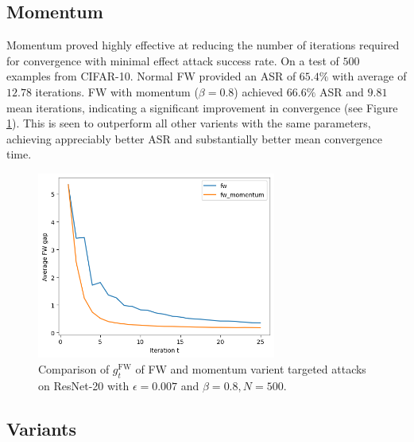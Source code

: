 \documentclass{article}
\begin{document}
\subsection{Momentum}

Momentum proved highly effective at reducing the number of iterations required for convergence with minimal effect attack success rate. On a test of $500$ examples from CIFAR-10. Normal FW provided an ASR of $65.4\%$ with average of $12.78$ iterations. FW with momentum ($\beta = 0.8$) achieved $66.6\%$ ASR and $9.81$ mean iterations, indicating a significant improvement in convergence (see Figure \ref{fig:momentum}). This is seen to outperform all other varients with the same parameters, achieving appreciably better ASR and substantially better mean convergence time.

\begin{figure}[H]
    \centering
    \includegraphics[width=0.7\textwidth]{plots/momentum.png}
    \caption{Comparison of $g_t^\text{FW}$ of FW and momentum varient targeted attacks on ResNet-20 with $\epsilon = 0.007$ and $\beta = 0.8, N = 500$.}
    \label{fig:momentum}
\end{figure}

\subsection{Variants}
\end{document}
